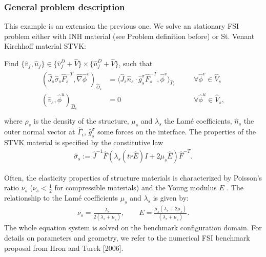 \subsubsection{General problem description}

This example is an extension the previous one.
We solve an stationary FSI problem either with 
INH material (see Problem definition before) 
or St. Venant Kirchhoff material STVK:  
\begin{Problem}
  \label{prob:stvk:lagrange}
  Find $\{\hat v_f,\hat u_f\} \in \{ \hat v_f^D + \hat V\} 
  \times \{ \hat u_f^D + \hat V\}$, 
  such that 
  \begin{eqnarray}
    \begin{aligned}   
      (\hat J_s \hat\sigma_s \hat F_s^{-T},\hat\nabla\hat\phi^v)_{\hat\Omega_s}
      &= \langle\hat J_s\hat n_s\cdot \hat g_s^\sigma\hat
      F_s^{-T},\hat\phi^v  \rangle_{\hat\Gamma_i}
      &&\quad\forall\hat \phi^v\in\hat V_s\\
      (\hat v_s,\hat\phi^u)_{\hat\Omega_s}&=0
      &&\quad\forall\hat \phi^u\in\hat V_s    ,\\
    \end{aligned}
  \end{eqnarray}
  where $\rho_s$ is the density of the structure, $\mu_s$ and $\lambda_s$ 
  the Lam\'e coefficients, $\hat n_s$ the outer normal vector at $\hat\Gamma_i$, 
  $\hat g_s^\sigma$ some forces on the interface. The properties of the STVK material
  is specified by the constitutive law
  \begin{eqnarray}
    \hat\sigma_s:=\hat J^{-1} \hat F (\lambda_s (tr\hat E) I + 2\mu_s \hat E)\hat F^{-T}.
  \end{eqnarray}
\end{Problem}
Often, the elasticity properties of structure materials is characterized by 
Poisson's ratio $\nu_s$ ($\nu_s < \frac{1}{2}$  for 
compressible materials) and the Young modulus $E$ . The 
relationship to the Lam\'e coefficients $\mu_s$ and $\lambda_s$ is
given by:
\begin{eqnarray}
\nu_s = \frac{\lambda_s}{2(\lambda_s + \mu_s)}, \qquad 
E = \frac{\mu_s (\lambda_s + 2\mu_s)}{(\lambda_s + \mu_s )} . 
\end{eqnarray}
The whole equation system is solved on the benchmark configuration domain. For 
details on parameters and geometry, we refer to the 
numerical FSI benchmark   proposal from Hron and Turek [2006].

